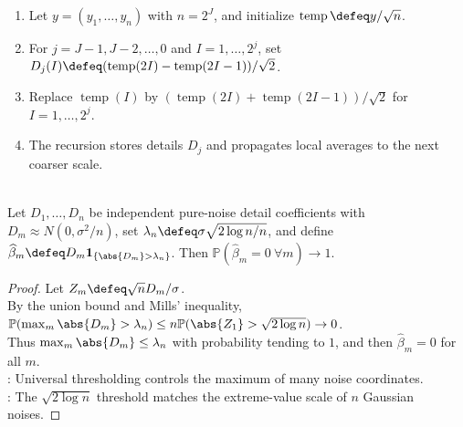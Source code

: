 \begin{method} \label{meth:haar-discrete-wavelet-transform} 
\begin{enumerate}[label=(\roman*)]
\setlength{\itemsep}{0pt}
\item Let $y=(y_1,\ldots,y_n)$ with $n=2^J$, and initialize $\operatorname{temp}\defeq y/\sqrt n$.
\item For $j=J-1,J-2,\ldots,0$ and $I=1,\ldots,2^j$, set $D_j(I)\defeq(\operatorname{temp}(2I)-\operatorname{temp}(2I-1))/\sqrt2$.
\item Replace $\operatorname{temp}(I)$ by $(\operatorname{temp}(2I)+\operatorname{temp}(2I-1))/\sqrt2$ for $I=1,\ldots,2^j$.
\item The recursion stores details $D_j$ and propagates local averages to the next coarser scale.
\end{enumerate}
\end{method}

\begin{theorem} \label{thm:universal-threshold-removes-pure-noise} \\
Let $D_1,\ldots,D_n$ be independent pure-noise detail coefficients with $D_m\approx N(0,\sigma^2/n)$, set $\lambda_n\defeq\sigma\sqrt{2\log n/n}$, and define $\widehat\beta_m\defeq D_m\mathbf{1}_{\{\abs{D_m}>\lambda_n\}}$. Then $\mathbb{P}(\widehat\beta_m=0\ \forall m)\to1$.
\begin{proof} Let $Z_m\defeq\sqrt nD_m/\sigma$.\\
By the union bound and Mills' inequality, $\mathbb{P}(\max_m\abs{D_m}>\lambda_n)\leq n\mathbb{P}(\abs{Z_1}>\sqrt{2\log n})\to0$.\\
Thus $\max_m\abs{D_m}\leq\lambda_n$ with probability tending to $1$, and then $\widehat\beta_m=0$ for all $m$.\\
: Universal thresholding controls the maximum of many noise coordinates.\\
: The $\sqrt{2\log n}$ threshold matches the extreme-value scale of $n$ Gaussian noises.
\end{proof}
\end{theorem}

